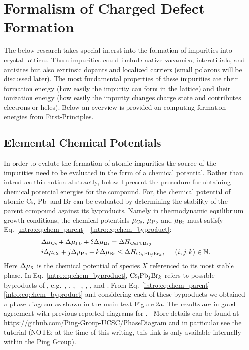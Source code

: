 \section{Formalism of Charged Defect Formation}

The below research takes special interst into the formation of impurities into crystal lattices. These impurities could include native vacancies, interstitials, and antisites but also extrinsic dopants and localized carriers (small polarons will be discussed later).
The most fundamental properties of these impurities are their formation energy (how easily the impurity can form in the lattice) and their ionization energy (how easily the impurity changes charge state and contributes electrons or holes).
Below an overview is provided on computing formation energies from First-Principles.

\subsection{Elemental Chemical Potentials}
In order to evalute the formation of atomic impurities the source of the impurities need to be evaluated in the form of a chemical potential. Rather than introduce this notion abstractly, below I present the procedure for obtaining chemical potential energies for the  compound.
For,  the chemical potential of atomic Cs, Pb, and Br can be evaluated by determining the stability of the parent compound  against its byproducts.
Namely in thermodynamic equilibrium growth conditions, the chemical potentials $\mu_{\rm Cs}$, $\mu_{\rm Pb}$ and $\mu_{\rm Br}$ must satisfy Eq.~\ref{intro:eq:chem_parent}$-$\ref{intro:eq:chem_byproduct}:
\begin{align}
    & \Delta \mu_{\rm Cs} + \Delta \mu_{\rm Pb} + 3\Delta \mu_{\rm Br} = \Delta H_{\ce{CsPbBr3}} \label{intro:eq:chem_parent} \\
    & i\Delta \mu_{\rm Cs} + j\Delta \mu_{\rm Pb} + k\Delta \mu_{\rm Br} \leq \Delta H_{ {\rm Cs}_i {\rm Pb}_j {\rm Br}_k}, \hspace{0.5cm} (i, j, k) \in \mathbb{N}. \label{intro:eq:chem_byproduct}
\end{align}
Here $\Delta \mu_{\rm X}$ is the chemical potential of species $X$ referenced to its most stable phase.
In Eq.~\ref{intro:eq:chem_byproduct}, ${\rm Cs}_i {\rm Pb}_j {\rm Br}_k$ refers to possible byproducts of , e.g.\ , , , , , , , and .
From Eq.~\ref{intro:eq:chem_parent}$-$\ref{intro:eq:chem_byproduct} and considering each of these byproducts we obtained a phase diagram as shown in the main text Figure 2a. The results are in good agreement with previous reported diagrams for .~\cite{kang2017high,li2019sodium}
More details can be found at \url{https://github.com/Ping-Group-UCSC/PhaseDiagram} and in particular see \href{https://github.com/Ping-Group-UCSC/PhaseDiagram/blob/main/Examples/CsPbBr3-PhaseDiagram/diagram.ipynb}{the  tutorial} (NOTE: at the time of this writing, this link is only available internally within the Ping Group).


